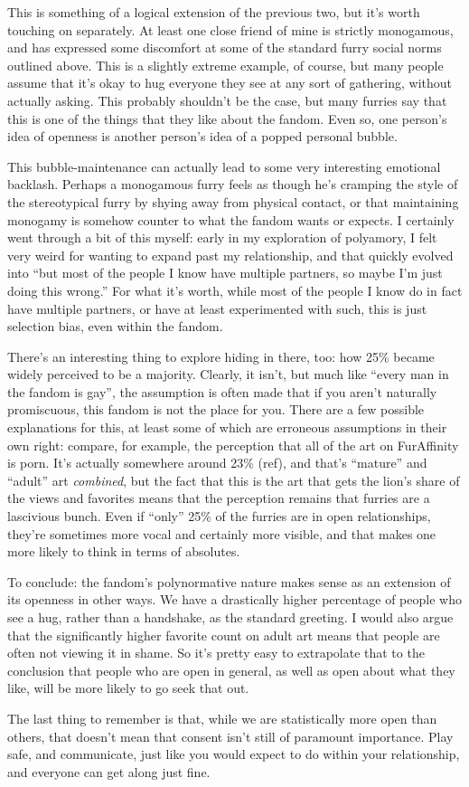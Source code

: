 This is something of a logical extension of the previous two, but it's worth touching on separately. At least one close friend of mine is strictly monogamous, and has expressed some discomfort at some of the standard furry social norms outlined above. This is a slightly extreme example, of course, but many people assume that it's okay to hug everyone they see at any sort of gathering, without actually asking. This probably shouldn't be the case, but many furries say that this is one of the things that they like about the fandom. Even so, one person's idea of openness is another person's idea of a popped personal bubble.

This bubble-maintenance can actually lead to some very interesting emotional backlash. Perhaps a monogamous furry feels as though he's cramping the style of the stereotypical furry by shying away from physical contact, or that maintaining monogamy is somehow counter to what the fandom wants or expects. I certainly went through a bit of this myself: early in my exploration of polyamory, I felt very weird for wanting to expand past my relationship, and that quickly evolved into ``but most of the people I know have multiple partners, so maybe I'm just doing this wrong.'' For what it's worth, while most of the people I know do in fact have multiple partners, or have at least experimented with such, this is just selection bias, even within the fandom.

There's an interesting thing to explore hiding in there, too: how 25\% became widely perceived to be a majority. Clearly, it isn't, but much like ``every man in the fandom is gay'', the assumption is often made that if you aren't naturally promiscuous, this fandom is not the place for you. There are a few possible explanations for this, at least some of which are erroneous assumptions in their own right: compare, for example, the perception that all of the art on FurAffinity is porn. It's actually somewhere around 23\% (ref), and that's ``mature'' and ``adult'' art \textit{combined}, but the fact that this is the art that gets the lion's share of the views and favorites means that the perception remains that furries are a lascivious bunch. Even if ``only'' 25\% of the furries are in open relationships, they're sometimes more vocal and certainly more visible, and that makes one more likely to think in terms of absolutes.

To conclude: the fandom's polynormative nature makes sense as an extension of its openness in other ways. We have a drastically higher percentage of people who see a hug, rather than a handshake, as the standard greeting. I would also argue that the significantly higher favorite count on adult art means that people are often not viewing it in shame. So it's pretty easy to extrapolate that to the conclusion that people who are open in general, as well as open about what they like, will be more likely to go seek that out.

The last thing to remember is that, while we are statistically more open than others, that doesn't mean that consent isn't still of paramount importance. Play safe, and communicate, just like you would expect to do within your relationship, and everyone can get along just fine.
